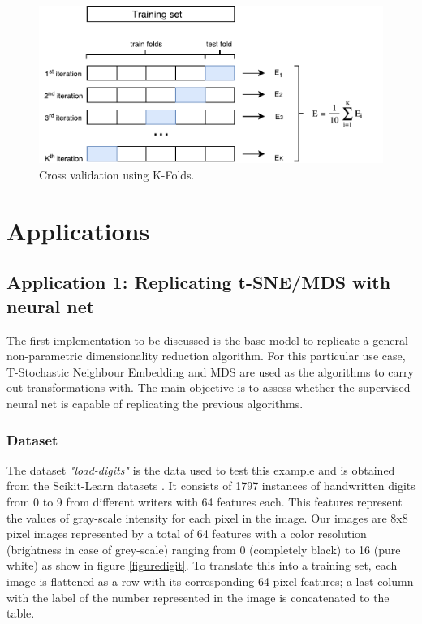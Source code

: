 \documentclass[a4paper,11pt,spanish]{report}
\begin{document}
\begin{figure}[p]
\centering
\includegraphics[width=15cm]{figures/cv.pdf}
\caption{\label{figurefit}Cross validation using K-Folds.}
\end{figure}


\chapter{Applications}
\label{chap:app}

\section{Application 1: Replicating t-SNE/MDS with neural net}
\label{sec:app1}

The first implementation to be discussed is the base model to replicate a general non-parametric dimensionality reduction algorithm. For this particular use case, T-Stochastic Neighbour Embedding and MDS are used as the algorithms to carry out transformations with. The main objective is to assess whether the supervised neural net is capable of replicating the previous algorithms.

\subsection{Dataset}
\label{ssec:data1}

The dataset \textit{"load-digits"} is the data used to test this example and is obtained from the Scikit-Learn datasets \citep{scikit-learn}. It consists of 1797 instances of handwritten digits from 0 to 9 from different writers with 64 features each. This features represent the values of gray-scale intensity for each pixel in the image. Our images are 8x8 pixel images represented by  a total of 64 features with a color resolution (brightness in case of grey-scale) ranging from 0 (completely black) to 16 (pure white) as show in figure \ref{figuredigit}. To translate this into a training set, each image is flattened as a row with its corresponding 64 pixel features; a last column with the label of the number represented in the image is concatenated to the table.
\end{document}
